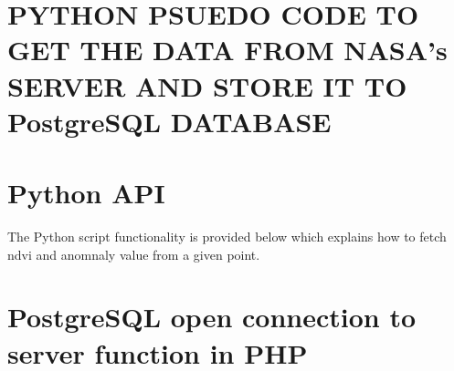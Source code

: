 \appendix
%
%

\chapter{PYTHON PSUEDO CODE TO GET THE DATA FROM NASA's SERVER AND STORE IT TO PostgreSQL DATABASE}\label{append:python_script_appendix}

\chapter{Python API}\label{append:python_api}

The Python script functionality is provided below which explains how to fetch \gls{ndvi} and anomnaly value from a given point. 



\newpage

\chapter{PostgreSQL open connection to server function in PHP}\label{append:php_webservice}



\newpage


